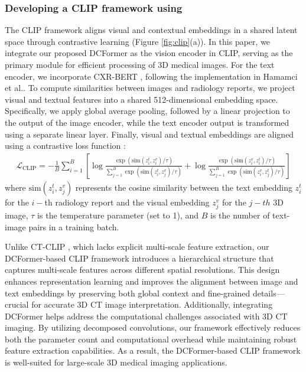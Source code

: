 \subsubsection*{Developing a CLIP framework using \dc}
The CLIP framework aligns visual and contextual embeddings in a shared latent space through contrastive learning (Figure \ref{fig:clip}(a)). In this paper, we integrate our proposed DCFormer as the vision encoder in CLIP, serving as the primary module for efficient processing of 3D medical images. For the text encoder, we incorporate CXR-BERT \cite{boecking2022making}, following the implementation in Hamamci et al.\cite{hamamci2024foundation}. To compute similarities between images and radiology reports, we project visual and textual features into a shared 512-dimensional embedding space. Specifically, we apply global average pooling, followed by a linear projection to the output of the image encoder, while the text encoder output is transformed using a separate linear layer. Finally, visual and textual embeddings are aligned using a contrastive loss function \cite{radford2021learning}:
\begin{align}
    \mathcal{L}_{\text{CLIP}} = - \frac{1}{B} \sum_{i=1}^B \left[ \log \frac{\exp\left(\text{sim}(z_i^t, z_i^v)/\tau\right)}{\sum_{j=1}^B \exp\left(\text{sim}(z_i^t, z_j^v)/\tau\right)} + \log \frac{\exp\left(\text{sim}(z_i^v, z_i^t)/\tau\right)}{\sum_{j=1}^B \exp\left(\text{sim}(z_i^v, z_j^t)/\tau\right)} \right]
\end{align}
where $\text{sim}(z_i^t, z_j^v)$ represents the cosine similarity between the text embedding $z_i^t$ for the $i-$th radiology report and the visual embedding $z_j^v$ for the $j-th$ 3D image, $\tau$ is the temperature parameter (set to 1), and $B$ is the number of text-image pairs in a training batch. 

Unlike CT-CLIP \cite{hamamci2024foundation}, which lacks explicit multi-scale feature extraction, our DCFormer-based CLIP framework introduces a hierarchical structure that captures multi-scale features across different spatial resolutions. This design enhances representation learning and improves the alignment between image and text embeddings by preserving both global context and fine-grained details—crucial for accurate 3D CT image interpretation. Additionally, integrating DCFormer helps address the computational challenges associated with 3D CT imaging. By utilizing decomposed convolutions, our framework effectively reduces both the parameter count and computational overhead while maintaining robust feature extraction capabilities. As a result, the DCFormer-based CLIP framework is well-suited for large-scale 3D medical imaging applications.

